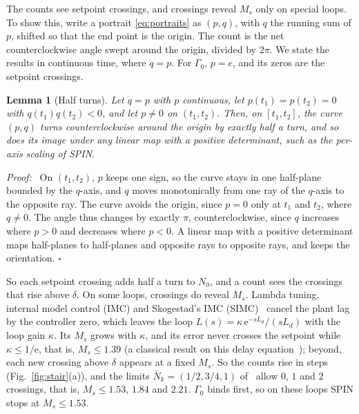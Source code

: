 \documentclass[letterpaper, 10 pt, conference]{ieeeconf}
\newtheorem{lemma}{Lemma}
\renewenvironment{proof}{\noindent\textit{Proof:}\ }{\hfill$\square$\par\smallskip}
\newcommand{\spin}{SPIN\xspace}
\begin{document}
The counts see setpoint crossings, and crossings reveal $M_s$ only on
special loops. To show this, write a portrait
\eqref{eq:portraits} as $(p,q)$, with $q$ the running sum of $p$,
shifted so that the end point is the origin. The count is the net
counterclockwise angle swept around the origin, divided by $2\pi$. We
state the results in continuous time, where $\dot q=p$. For $\Gamma_0$,
$p=e$, and its zeros are the setpoint crossings.

\begin{lemma}[Half turns]
\label{lem:half}
Let $\dot q=p$ with $p$ continuous, let $p(t_1)=p(t_2)=0$ with
$q(t_1)q(t_2)<0$, and let $p\neq0$ on $(t_1,t_2)$. Then, on
$[t_1,t_2]$, the curve $(p,q)$ turns counterclockwise around the origin
by exactly half a turn, and so does its image under any linear map with
a positive determinant, such as the per-axis scaling of \spin.
\end{lemma}

\begin{proof}
On $(t_1,t_2)$, $p$ keeps one sign, so the curve stays in one half-plane
bounded by the $q$-axis, and $q$ moves monotonically from one ray of the
$q$-axis to the opposite ray. The curve avoids the origin, since $p=0$
only at $t_1$ and $t_2$, where $q\neq0$. The angle thus changes by
exactly $\pi$, counterclockwise, since $q$ increases where $p>0$ and
decreases where $p<0$. A linear map with a positive determinant maps
half-planes to half-planes and opposite rays to opposite rays, and keeps
the orientation.
\end{proof}

So each setpoint crossing adds half a turn to $N_0$, and a count sees
the crossings that rise above $\delta$. On some loops, crossings do
reveal $M_s$. Lambda tuning, internal model control (IMC) and Skogestad's IMC
(SIMC)~\cite{Skogestad2003} cancel the plant lag by the controller zero, which leaves the loop
$L(s)=\kappa\,\mathrm{e}^{-sL_d}/(sL_d)$ with the loop gain $\kappa$. Its
$M_s$ grows with $\kappa$, and its error never crosses the setpoint while
$\kappa\le1/\mathrm{e}$, that is, $M_s\le1.39$ (a classical result on
this delay equation~\cite{GyoriLadas1991}); beyond, each new crossing
above $\delta$ appears at a fixed $M_s$. So the counts rise in steps
(Fig.~\ref{fig:stair}(a)), and the limits $\bar N_k=(1/2,3/4,1)$ of~\cite{SPIN} allow $0$, $1$ and $2$ crossings, that is, $M_s\le1.53$,
$1.84$ and $2.21$. $\Gamma_0$ binds first, so on these loops \spin stops
at $M_s\le1.53$.
\end{document}
